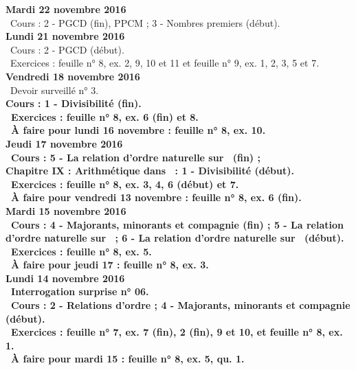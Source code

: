 \documentclass[12pt,a4paper]{article}
\begin{document}
\noindent\textbf{Mardi 22 novembre 2016}\\
\bu\ Cours : 2 - PGCD (fin), PPCM ; 3 - Nombres premiers (début).\vspace{.4cm}\\
   
\noindent\textbf{Lundi 21 novembre 2016}\\
\bu\ Cours : 2 - PGCD (début).\\
\bu\ Exercices : feuille n° 8, ex. 2, 9, 10 et 11 et feuille n° 9, ex. 1, 2, 3, 5 et 7.\vspace{.4cm}\\

\noindent\textbf{Vendredi 18 novembre 2016}\\
\bu\ Devoir surveillé n° 3.\\
\bf Cours : 1 - Divisibilité (fin).\\
\bu\ Exercices : feuille n° 8, ex. 6 (fin) et 8.\\
\bu\ À faire pour lundi 16 novembre : feuille n° 8, ex. 10.\vspace{.4cm}\\
 
\noindent\textbf{Jeudi 17 novembre 2016}\\
\bu\ Cours : 5 - La relation d'ordre naturelle sur \R\ (fin) ;\\
\bf Chapitre IX \rm : Arithmétique dans \Z\ : 1 - Divisibilité (début).\\
\bu\ Exercices : feuille n° 8, ex. 3, 4, 6 (début) et 7.\\
\bu\ À faire pour vendredi 13 novembre : feuille n° 8, ex. 6 (fin).\vspace{.4cm}\\

\noindent\textbf{Mardi 15 novembre 2016}\\
\bu\ Cours : 4 - Majorants, minorants et compagnie (fin) ; 5 - La relation d'ordre naturelle sur \N\ ; 6 - La relation 
d'ordre naturelle sur \R\ (début).\\
\bu\ Exercices : feuille n° 8, ex. 5.\\
\bu\ À faire pour jeudi 17 : feuille n° 8, ex. 3.\vspace{.4cm}\\

\noindent\textbf{Lundi 14 novembre 2016}\\
\bu\ Interrogation surprise n° 06.\\
\bu\ Cours : 2 - Relations d'ordre ;  4 - Majorants, minorants et compagnie (début).\\
\bu\ Exercices : feuille n° 7, ex. 7 (fin), 2 (fin), 9 et 10, et feuille n° 8, ex. 1.\\
\bu\ À faire pour mardi 15 : feuille n° 8, ex. 5, qu. 1.\vspace{.4cm}\\
\end{document}
